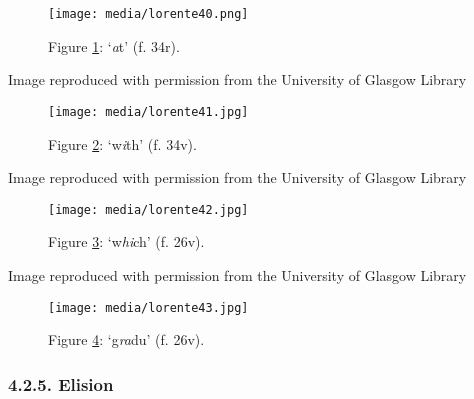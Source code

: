 \documentclass{article}
\begin{document}
\begin{figure}[H]
  \centering
    \texttt{[image: media/lorente40.png]}
    \caption{Figure \ref{fig:lorente40}: `\th\emph{a}t' (f. 34r).}
    \label{fig:lorente40}
  \end{figure}


 Image reproduced with permission from the University of Glasgow Library 


 
  \begin{figure}
    \texttt{[image: media/lorente41.jpg]}
    \caption{Figure \ref{fig:lorente41}: `w\emph{i}th' (f. 34v).}
    \label{fig:lorente41}
\end{figure}


 Image reproduced with permission from the University of Glasgow Library 


 
\begin{figure}[H]
  \centering
    \texttt{[image: media/lorente42.jpg]}
    \caption{Figure \ref{fig:lorente42}: `w\emph{hi}ch' (f. 26v).}
    \label{fig:lorente42}
  \end{figure}


 Image reproduced with permission from the University of Glasgow Library 


 
  \begin{figure}
    \texttt{[image: media/lorente43.jpg]}
    \caption{Figure \ref{fig:lorente43}: `g\emph{ra}du' (f.
26v).\protect \footnotemark}
    \label{fig:lorente43}
\end{figure}

\subsubsection{4.2.5. Elision}
\end{document}
